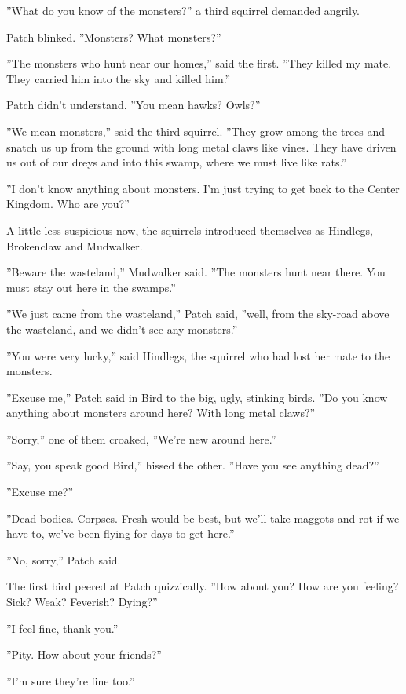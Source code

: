 \documentclass[11pt]{article}
\begin{document}
 ''What do you know of the monsters?'' a third squirrel demanded angrily.\par
 Patch blinked. ''Monsters? What monsters?''\par
 ''The monsters who hunt near our homes,'' said the first. ''They killed my mate. They carried him into the sky and killed him.''\par
 Patch didn't understand. ''You mean hawks? Owls?''\par
 ''We mean monsters,'' said the third squirrel. ''They grow among the trees and snatch us up from the ground with long metal claws like vines. They have driven us out of our dreys and into this swamp, where we must live like rats.''\par
 ''I don't know anything about monsters. I'm just trying to get back to the Center Kingdom. Who are you?''\par
 A little less suspicious now, the squirrels introduced themselves as Hindlegs, Brokenclaw and Mudwalker.\par
 ''Beware the wasteland,'' Mudwalker said. ''The monsters hunt near there. You must stay out here in the swamps.''\par
 ''We just came from the wasteland,'' Patch said, ''well, from the sky-road above the wasteland, and we didn't see any monsters.''\par
 ''You were very lucky,'' said Hindlegs, the squirrel who had lost her mate to the monsters. \par
 ''Excuse me,'' Patch said in Bird to the big, ugly, stinking birds. ''Do you know anything about monsters around here? With long metal claws?''\par
 ''Sorry,'' one of them croaked, ''We're new around here.''\par
 ''Say, you speak good Bird,'' hissed the other. ''Have you see anything dead?''\par
 ''Excuse me?''\par
 ''Dead bodies. Corpses. Fresh would be best, but we'll take maggots and rot if we have to, we've been flying for days to get here.''\par
 ''No, sorry,'' Patch said.\par
 The first bird peered at Patch quizzically. ''How about you? How are you feeling? Sick? Weak? Feverish? Dying?''\par
''I feel fine, thank you.''\par
''Pity. How about your friends?''\par
''I'm sure they're fine too.''\par
\end{document}
